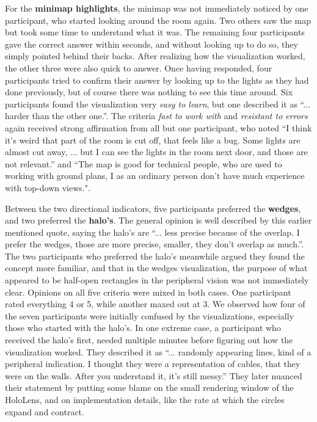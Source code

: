For the \textbf{minimap highlights}, the minimap was not immediately noticed by one participant, who started looking around the room again. Two others saw the map but took some time to understand what it was. The remaining four participants gave the correct answer within seconds, and without looking up to do so, they simply pointed behind their backs. After realizing how the visualization worked, the other three were also quick to answer. Once having responded, four participants tried to confirm their answer by looking up to the lights as they had done previously, but of course there was nothing to see this time around. Six participants found the visualization very \textit{easy to learn}, but one described it as ``... harder than the other one.''. The criteria \textit{fast to work with} and \textit{resistant to errors} again received strong affirmation from all but one participant, who noted ``I think it's weird that part of the room is cut off, that feels like a bug. Some lights are almost cut away, ... but I can see the lights in the room next door, and those are not relevant.'' and ``The map is good for technical people, who are used to working with ground plans, I as an ordinary person don't have much experience with top-down views.".

Between the two directional indicators, five participants preferred the \textbf{wedges}, and two preferred the \textbf{halo's}. The general opinion is well described by this earlier mentioned quote, saying the halo's are ``... less precise because of the overlap. I prefer the wedges, those are more precise, smaller, they don't overlap as much.''. The two participants who preferred the halo's meanwhile argued they found the concept more familiar, and that in the wedges visualization, the purpose of what appeared to be half-open rectangles in the peripheral vision was not immediately clear. Opinions on all five criteria were mixed in both cases. One participant rated everything 4 or 5, while another maxed out at 3. We observed how four of the seven participants were initially confused by the visualizations, especially those who started with the halo's. In one extreme case, a participant who received the halo's first, needed multiple minutes before figuring out how the visualization worked. They described it as ``... randomly appearing lines, kind of a peripheral indication. I thought they were a representation of cables, that they were on the walls. After you understand it, it's still messy.'' They later nuanced their statement by putting some blame on the small rendering window of the HoloLens, and on implementation details, like the rate at which the circles expand and contract.

